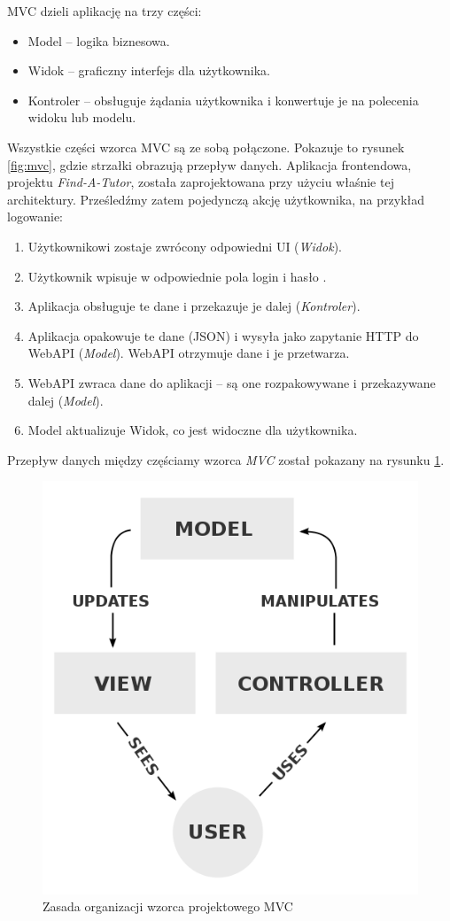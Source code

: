 \documentclass[12pt]{article}
\numberwithin{figure}{section}
\begin{document}
\begin{sloppypar}
MVC dzieli aplikację na trzy części:
\begin{itemize}
    \item Model -- logika biznesowa.
    \item Widok -- graficzny interfejs dla użytkownika.
    \item Kontroler -- obsługuje żądania użytkownika i konwertuje je na polecenia widoku lub modelu.
\end{itemize}
    
Wszystkie części wzorca MVC są ze sobą połączone. Pokazuje to rysunek \ref{fig:mvc}, gdzie strzałki obrazują przepływ danych.
Aplikacja frontendowa, projektu \textit{Find-A-Tutor}, została zaprojektowana przy użyciu właśnie tej architektury. 
Prześledźmy zatem pojedynczą akcję użytkownika, na przykład logowanie:
\begin{enumerate}
    \item Użytkownikowi zostaje zwrócony odpowiedni UI (\textit{Widok}).
    \item Użytkownik wpisuje w odpowiednie pola login i hasło .
    \item Aplikacja obsługuje te dane i przekazuje je dalej (\textit{Kontroler}).
    \item Aplikacja opakowuje te dane (JSON) i wysyła jako zapytanie HTTP do WebAPI (\textit{Model}). WebAPI otrzymuje dane i je przetwarza.
    \item WebAPI zwraca dane do aplikacji -- są one rozpakowywane i przekazywane dalej (\textit{Model}).
    \item Model aktualizuje Widok, co jest widoczne dla użytkownika.
\end{enumerate}
    
Przepływ danych między częściamy wzorca \textit{MVC} został pokazany na rysunku \ref{fig:mvc-flow}.
    
\begin{figure}[H] 
    \centering
    \includegraphics[width=.5\textwidth]{images/chapter_3/mvc-flow.png}
    \caption{Zasada organizacji wzorca projektowego MVC \cite{mvc-flow}}
    \label{fig:mvc-flow}
\end{figure}
    

\end{sloppypar}
\end{document}

